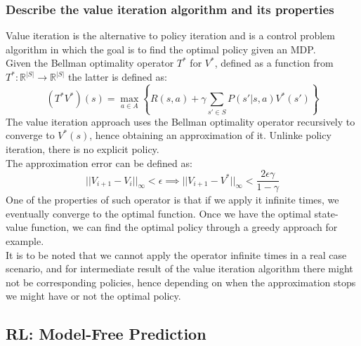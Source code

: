 \subsubsection{Describe the value iteration algorithm and its properties}
    Value iteration is the alternative to policy iteration and is a control problem algorithm in which the goal is to find the optimal policy given an MDP.\\
    Given the Bellman optimality operator $T^*$ for $V^*$, defined as a function from $T^*: \mathbb{R}^{|S|} \rightarrow \mathbb{R}^{|S|}$ the latter is defined as:
    $$
    (T^*V^*) (s) = \max_{a \in A} \left\{ R(s,a ) + \gamma \sum _{s' \in S} P(s'| s, a) V^* (s')\right\}
    $$
    The value iteration approach uses the Bellman optimality operator recursively to converge to $V^*(s)$, hence obtaining an approximation of it. Unlinke policy iteration, there is no explicit policy.\\
    The approximation error can be defined as:
    $$
    ||V_{i+1}-V_i||_\infty<\epsilon\implies ||V_{i+1}-V^*||_\infty<\frac{2\epsilon\gamma}{1-\gamma}
    $$
    One of the properties of such operator is that if we apply it infinite times, we eventually converge to the optimal function. Once we have the optimal state-value function, we can find the optimal policy through a greedy approach for example.\\
    It is to be noted that we cannot apply the operator infinite times in a real case scenario, and for intermediate result of the value iteration algorithm there might not be corresponding policies, hence depending on when the approximation stops we might have or not the optimal policy.

\subsection{RL: Model-Free Prediction}
